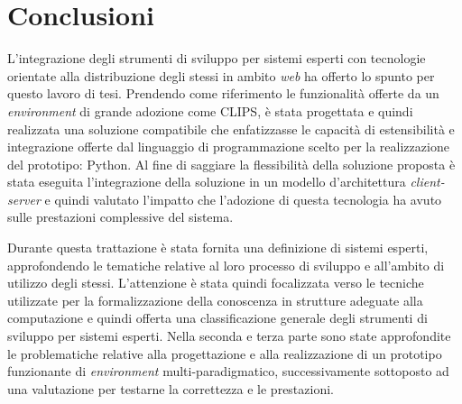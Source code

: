 \chapter*{Conclusioni}
\rhead{}



L'integrazione degli strumenti di sviluppo per sistemi esperti con tecnologie orientate alla distribuzione degli stessi in ambito \emph{web} ha offerto lo spunto per questo lavoro di tesi. Prendendo come riferimento le funzionalità offerte da un \emph{environment} di grande adozione come CLIPS, è stata progettata e quindi realizzata una soluzione compatibile che enfatizzasse le capacità di estensibilità e integrazione offerte dal linguaggio di programmazione scelto per la realizzazione del prototipo: Python. Al fine di saggiare la flessibilità della soluzione proposta è stata eseguita l'integrazione della soluzione in un modello d'architettura \emph{client-server} e quindi valutato l'impatto che l'adozione di questa tecnologia ha avuto sulle prestazioni complessive del sistema.

Durante questa trattazione è stata fornita una definizione di sistemi esperti, approfondendo le tematiche relative al loro processo di sviluppo e all'ambito di utilizzo degli stessi. L'attenzione è stata quindi focalizzata verso le tecniche utilizzate per la formalizzazione della conoscenza in strutture adeguate alla computazione e quindi offerta una classificazione generale degli strumenti di sviluppo per sistemi esperti.
Nella seconda e terza parte sono state approfondite le problematiche relative alla progettazione e alla realizzazione di un prototipo funzionante di \emph{environment} multi-paradigmatico, successivamente sottoposto ad una valutazione per testarne la correttezza e le prestazioni.

